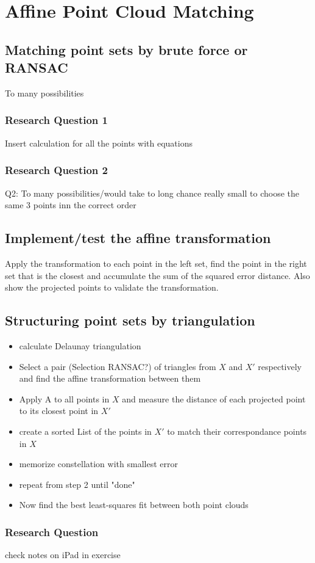 \chapter{Affine Point Cloud Matching}


\section{Matching point sets by brute force or RANSAC}

To many possibilities

\subsection{Research Question 1}
Insert calculation for all the points with equations

\subsection{Research Question 2}
Q2: To many possibilities/would take to long chance really small to choose the same 3 points inn the correct order

\section{Implement/test the affine transformation}

Apply the transformation to each point in the left set, find the point in the right set that is the closest and accumulate the sum of the squared error distance. Also show the projected points to validate the transformation.

\section{Structuring point sets by triangulation}

\begin{itemize}
	\item calculate Delaunay triangulation
	\item Select a pair (Selection RANSAC?) of triangles from $X$ and $X'$ respectively and find the affine transformation between them
	\item Apply A to all points in $X$ and measure the distance of each projected point to its closest point in $X'$
	\item create a sorted List of the points in $X'$ to match their correspondance points in $X$
	\item memorize constellation with smallest error
	\item repeat from step 2 until "done"
	\item Now find the best least-squares fit between both point clouds
\end{itemize}

\subsection{Research Question}
check notes on iPad in exercise 